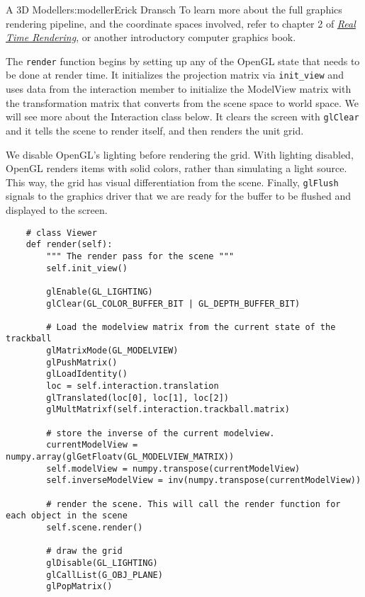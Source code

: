 \begin{aosachapter}{A 3D Modeller}{s:modeller}{Erick Dransch}
To learn more about the full graphics rendering pipeline, and the
coordinate spaces involved, refer to chapter 2 of
\href{http://www.realtimerendering.com/}{\emph{Real Time Rendering}}, or
another introductory computer graphics book.

\label{rendering-with-the-viewer}

The \texttt{render} function begins by setting up any of the OpenGL
state that needs to be done at render time. It initializes the
projection matrix via \texttt{init\_view} and uses data from the
interaction member to initialize the ModelView matrix with the
transformation matrix that converts from the scene space to world space.
We will see more about the Interaction class below. It clears the screen
with \texttt{glClear} and it tells the scene to render itself, and then
renders the unit grid.

We disable OpenGL's lighting before rendering the grid. With lighting
disabled, OpenGL renders items with solid colors, rather than simulating
a light source. This way, the grid has visual differentiation from the
scene. Finally, \texttt{glFlush} signals to the graphics driver that we
are ready for the buffer to be flushed and displayed to the screen.

\begin{verbatim}
    # class Viewer
    def render(self):
        """ The render pass for the scene """
        self.init_view()

        glEnable(GL_LIGHTING)
        glClear(GL_COLOR_BUFFER_BIT | GL_DEPTH_BUFFER_BIT)

        # Load the modelview matrix from the current state of the trackball
        glMatrixMode(GL_MODELVIEW)
        glPushMatrix()
        glLoadIdentity()
        loc = self.interaction.translation
        glTranslated(loc[0], loc[1], loc[2])
        glMultMatrixf(self.interaction.trackball.matrix)

        # store the inverse of the current modelview.
        currentModelView = numpy.array(glGetFloatv(GL_MODELVIEW_MATRIX))
        self.modelView = numpy.transpose(currentModelView)
        self.inverseModelView = inv(numpy.transpose(currentModelView))

        # render the scene. This will call the render function for each object in the scene
        self.scene.render()

        # draw the grid
        glDisable(GL_LIGHTING)
        glCallList(G_OBJ_PLANE)
        glPopMatrix()


\end{verbatim}
\end{aosachapter}
